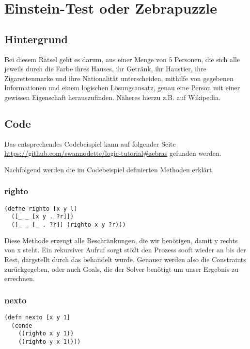 \section{Einstein-Test oder Zebrapuzzle}

\subsection{Hintergrund}

Bei diesem Rätsel geht es darum, aus einer Menge von 5 Personen, die sich alle jeweils durch die Farbe ihres Hauses, ihr Getränk, ihr Haustier, ihre Zigarettenmarke und ihre Nationalität unterscheiden, mithilfe von gegebenen Informationen und einem logischen Lösungsansatz, genau eine Person mit einer gewissen Eigenschaft herauszufinden. Näheres hierzu z.B. auf Wikipedia.

\subsection{Code}

Das entsprechendes Codebeispiel kann auf folgender Seite \url{https://github.com/swannodette/logic-tutorial#zebras} gefunden werden.


Nachfolgend werden die im Codebeispiel definierten Methoden erklärt.

\subsubsection{righto}

\begin{lstlisting}
(defne righto [x y l]
  ([_ _ [x y . ?r]])
  ([_ _ [_ . ?r]] (righto x y ?r)))
\end{lstlisting}

Diese Methode erzeugt alle Beschränkungen, die wir benötigen, damit \dq{}y\dq{} rechts von \dq{}x\dq{} steht. Ein rekursiver Aufruf sorgt stößt den Prozess sooft wieder an bis der Rest, dargstellt durch das  behandelt wurde. Genauer werden also die Constraints zurückgegeben, oder auch Goals, die der Solver benötigt um unser Ergebnis zu errechnen.

\subsubsection{nexto}

\begin{lstlisting}
(defn nexto [x y 1]
  (conde
    ((righto x y 1))
    ((righto y x 1))))
\end{lstlisting}

